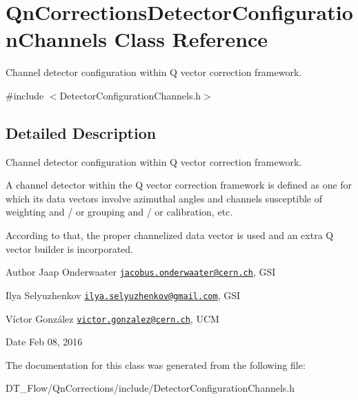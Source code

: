 \hypertarget{classQnCorrectionsDetectorConfigurationChannels}{}\section{Qn\+Corrections\+Detector\+Configuration\+Channels Class Reference}
\label{classQnCorrectionsDetectorConfigurationChannels}


Channel detector configuration within Q vector correction framework.  




{\ttfamily \#include $<$Detector\+Configuration\+Channels.\+h$>$}



\subsection{Detailed Description}
Channel detector configuration within Q vector correction framework. 

A channel detector within the Q vector correction framework is defined as one for which its data vectors involve azimuthal angles and channels susceptible of weighting and / or grouping and / or calibration, etc.

According to that, the proper channelized data vector is used and an extra Q vector builder is incorporated.

\begin{DoxyAuthor}{Author}
Jaap Onderwaater \href{mailto:jacobus.onderwaater@cern.ch}{\tt jacobus.\+onderwaater@cern.\+ch}, G\+SI 

Ilya Selyuzhenkov \href{mailto:ilya.selyuzhenkov@gmail.com}{\tt ilya.\+selyuzhenkov@gmail.\+com}, G\+SI 

Víctor González \href{mailto:victor.gonzalez@cern.ch}{\tt victor.\+gonzalez@cern.\+ch}, U\+CM 
\end{DoxyAuthor}
\begin{DoxyDate}{Date}
Feb 08, 2016 
\end{DoxyDate}


The documentation for this class was generated from the following file\+:\begin{DoxyCompactItemize}
\item 
D\+T\+\_\+\+Flow/\+Qn\+Corrections/include/Detector\+Configuration\+Channels.\+h\end{DoxyCompactItemize}
